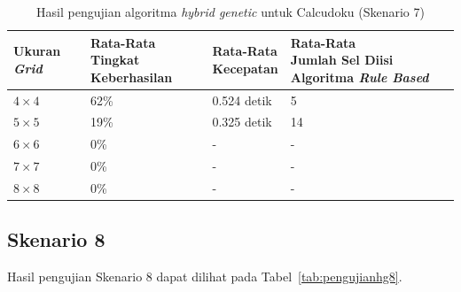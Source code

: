 \begin{table}
\centering
\captionsetup{justification=centering}
\caption[Hasil pengujian algoritma \textit{hybrid genetic} untuk Calcudoku (Skenario 7)]{Hasil pengujian algoritma \textit{hybrid genetic} untuk Calcudoku (Skenario 7)}
\begin{tabular}{| l | l | l | l |}
\hline
Ukuran \textit{Grid} & \makecell[l]{Rata-Rata \\ Tingkat Keberhasilan} & \makecell[l]{Rata-Rata \\ Kecepatan} & \makecell[l]{Rata-Rata \\ Jumlah Sel Diisi Algoritma \textit{Rule Based}} \\
\hline \hline
\begin{math}4 \times 4\end{math} & 62\% & 0.524 detik & 5 \\
\hline
\begin{math}5 \times 5\end{math} & 19\% & 0.325 detik & 14 \\
\hline
\begin{math}6 \times 6\end{math} & 0\% & - & - \\
\hline
\begin{math}7 \times 7\end{math} & 0\% & - & - \\
\hline
\begin{math}8 \times 8\end{math} & 0\% & - & - \\
\hline
\end{tabular}
\label{tab:pengujianhg7}
\end{table}

\clearpage

\subsection{Skenario 8}
\label{sec:skenario8}

Hasil pengujian Skenario 8 dapat dilihat pada Tabel~\ref{tab:pengujianhg8}.

